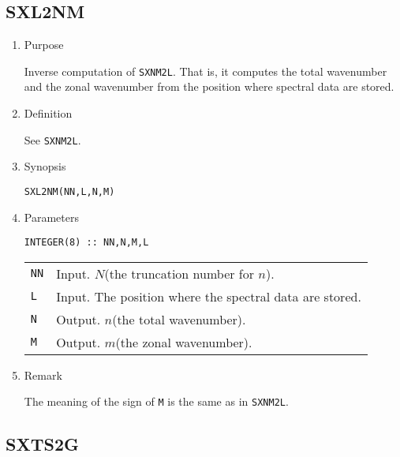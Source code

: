 \documentclass[a4paper]{scrartcl}
\begin{document}

\subsection{SXL2NM}

\begin{enumerate}

\item Purpose 

Inverse computation of \texttt{SXNM2L}.
That is, 
it computes 
the total wavenumber and the zonal wavenumber from
the position where spectral data are stored.

\item Definition

See \texttt{SXNM2L}.

\item Synopsis 
    
\texttt{SXL2NM(NN,L,N,M)}
  
\item Parameters

\begin{verbatim}
INTEGER(8) :: NN,N,M,L  
\end{verbatim}

\begin{tabular}{ll}
\texttt{NN} & Input. $N$(the truncation number for $n$).\\
\texttt{L} & Input. The position where the spectral
data are stored.\\
\texttt{N} & Output. $n$(the total wavenumber).\\
\texttt{M} & Output. $m$(the zonal wavenumber).
\end{tabular}

\item Remark

 The meaning of the sign of \texttt{M} is the same as in \texttt{SXNM2L}.

\end{enumerate}


\subsection{SXTS2G}
\end{document}
